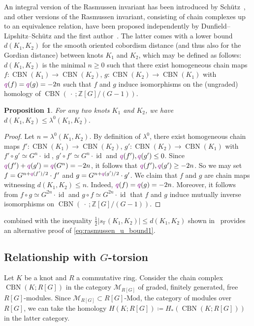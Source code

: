 \documentclass[11pt,a4paper,twoside]{amsart}
\let\cref\Cref
\newtheorem{proposition}[theorem]{Proposition}
\theoremstyle{definition}
\def\lambda{λ}%
\newcommand{\lambdau}{\lambda^0}
\newcommand{\BNr}{{\operatorname{CBN}}}%
\newcommand{\id}{\operatorname{id}}%
\newcommand{\Z}{\mathbb{Z}}
\newcommand{\QGrad}[1]{{\textcolor{violet}{#1}}}
\begin{document}
An integral version of the Rasmussen invariant has been introduced by Schütz~\cite{schuetz},
and other versions of the Rasmussen invariant, consisting of chain complexes up to an equivalence relation, have been proposed independently by Dunfield--Lipshitz--Schütz \cite{arXiv2312.09114} and the first author~\cite{arXiv2401.08480}.
The latter comes with a lower bound $d(K_1, K_2)$ for the smooth oriented cobordism distance (and thus also for the Gordian distance) between knots $K_1$ and $K_2$, which may be defined as follows:
$d(K_1, K_2)$ is the minimal $n \geq 0$ such that there exist homogeneous chain maps
$f\colon \BNr(K_1) \to \BNr(K_2)$,
$g\colon \BNr(K_2) \to \BNr(K_1)$
with $\QGrad{q}(f) = \QGrad{q}(g) = -2n$ such that $f$ and $g$ induce isomorphisms on
the (ungraded) homology of $\BNr(\ \cdot\ ;\Z[G]/(G-1))$.
\begin{proposition}\label{prop:sz}
For any two knots \(K_1\) and \(K_2\), we have \(d(K_1, K_2) \leq \lambdau(K_1, K_2)\).
\end{proposition}
\begin{proof}
Let $n = \lambdau(K_1, K_2)$.
By definition of $\lambdau$,
there exist homogeneous chain maps
$f'\colon \BNr(K_1) \to \BNr(K_2)$, $g'\colon \BNr(K_2) \to \BNr(K_1)$
with $f'\circ g' \simeq G^n\cdot\id$, $g'\circ f' \simeq G^n\cdot\id$
and $\QGrad{q}(f'), \QGrad{q}(g') \leq 0$.
Since $\QGrad{q}(f') + \QGrad{q}(g') = \QGrad{q}(G^n) = -2n$, 
it follows that $\QGrad{q}(f'), \QGrad{q}(g') \geq -2n$.
So we may set $f = G^{n + \QGrad{q}(f')/2} \cdot f'$ and 
$g = G^{n + \QGrad{q}(g')/2} \cdot g'$.
We claim that $f$ and $g$ are chain maps witnessing $d(K_1, K_2) \leq n$.
Indeed, $\QGrad{q}(f) = \QGrad{q}(g) = -2n$.
Moreover, it follows from $f\circ g \simeq G^{2n}\cdot\id$ and $g\circ f \simeq G^{2n}\cdot\id$
that $f$ and $g$ induce mutually inverse isomorphisms on $\BNr(\ \cdot\ ;\Z[G]/(G-1))$.
\end{proof}
\cref{prop:sz} combined with the inequality
$\tfrac{1}{2}|s_{\mathbb{F}}(K_1, K_2)| \leq d(K_1, K_2)$ shown in~\cite[Proposition~8.5]{arXiv2401.08480}
provides an alternative proof of \eqref{eq:rasmussen_u_bound1}.



\subsection{\texorpdfstring{Relationship with $G$-torsion}{Relationship with G-torsion}}


Let $K$ be a knot and $R$ a commutative ring.
Consider the chain complex $\BNr(K;R[G])$ in the category $\mathcal{M}_{R[G]}$ of graded, finitely generated, free $R[G]$-modules. Since $\mathcal{M}_{R[G]} \subset R[G]\textrm{-Mod}$, the category of modules over~$R[G]$, we can take the homology $H(K;R[G]) \coloneqq H_*(\BNr(K;R[G]))$ in the latter category. 
\end{document}
